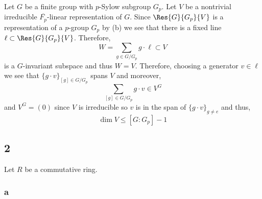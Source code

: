 \documentclass[12pt]{article}
\begin{document}
Let $G$ be a finite group with $p$-Sylow subgroup $G_p$. Let $V$ be a nontrivial irreducible $\overline{F_p}$-linear representation of $G$. Since $\Res{G}{G_p}{V}$ is a representation of a $p$-group $G_p$ by (b) we see that there is a fixed line $\ell \subset \Res{G}{G_p}{V}$. Therefore, 
\[ W = \sum_{g \in G / G_p} g \cdot \ell \subset V \]
is a $G$-invariant subspace and thus $W = V$. Therefore, choosing a generator $v \in \ell$ we see that $\{ g \cdot v \}_{[g] \in G / G_p}$ spans $V$ and moreover,
\[ \sum_{[g] \in G / G_p} g \cdot v \in V^G \]
and $V^G = (0)$ since $V$ is irreducible so $v$ is in the span of $\{ g \cdot v \}_{g \neq e}$ and thus,
\[ \dim{V} \le [G : G_p] - 1 \]

\subsection{2}

Let $R$ be a commutative ring.

\subsubsection{a}
\end{document}
